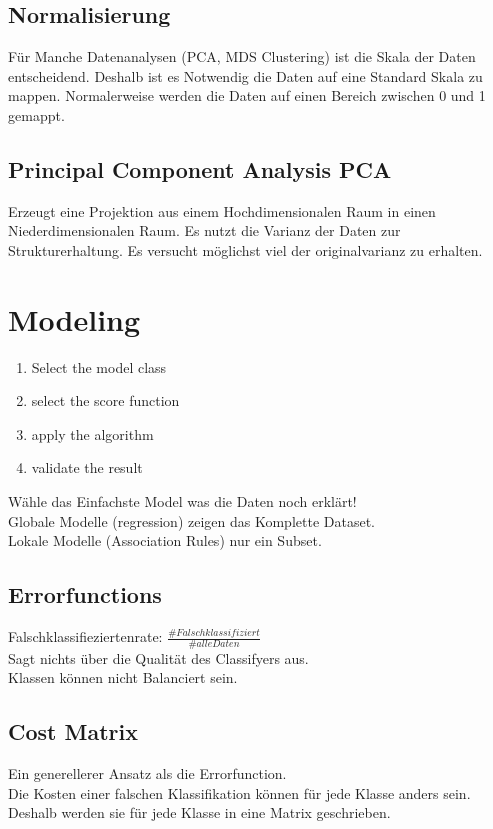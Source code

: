 \documentclass[a4paper]{scrartcl}
\begin{document}
\subsection{Normalisierung}
Für Manche Datenanalysen (PCA, MDS Clustering) ist die Skala der Daten entscheidend. Deshalb ist es Notwendig die Daten auf eine Standard Skala zu mappen. Normalerweise werden die Daten auf einen Bereich zwischen 0 und 1 gemappt.

\subsection{Principal Component Analysis PCA}
Erzeugt eine Projektion aus einem Hochdimensionalen Raum in einen Niederdimensionalen Raum. Es nutzt die Varianz der Daten zur Strukturerhaltung. Es versucht möglichst viel der originalvarianz zu erhalten.
\pagebreak
\section{Modeling}
\begin{enumerate}
\item Select the model class
\item select the score function
\item apply the algorithm
\item validate the result
\end{enumerate}
Wähle das Einfachste Model was die Daten noch erklärt!\\
Globale Modelle (regression) zeigen das Komplette Dataset.\\
Lokale Modelle (Association Rules) nur ein Subset.\\
\subsection{Errorfunctions}
Falschklassifieziertenrate: $\frac{\#Falschklassifiziert}{\#alle Daten}$\\
Sagt nichts über die Qualität des Classifyers aus.\\
Klassen können nicht Balanciert sein.\\

\subsection{Cost Matrix}
Ein generellerer Ansatz als die Errorfunction.\\
Die Kosten einer falschen Klassifikation können für jede Klasse anders sein.\\
Deshalb werden sie für jede Klasse in eine Matrix geschrieben.\\
\end{document}
